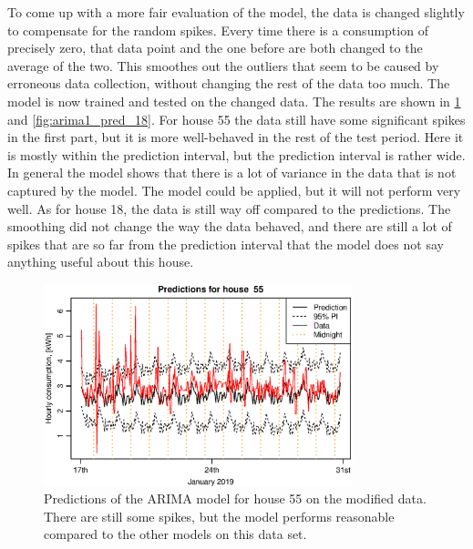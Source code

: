 \noindent To come up with a more fair evaluation of the model, the data is changed slightly to compensate for the random spikes. Every time there is a consumption of precisely zero, that data point and the one before are both changed to the average of the two. This smoothes out the outliers that seem to be caused by erroneous data collection, without changing the rest of the data too much. The model is now trained and tested on the changed data. The results are shown in \cref{fig:arima1_pred_55} and \cref{fig:arima1_pred_18}. For house 55 the data still have some significant spikes in the first part, but it is more well-behaved in the rest of the test period. Here it is mostly within the prediction interval, but the prediction interval is rather wide. In general the model shows that there is a lot of variance in the data that is not captured by the model. The model could be applied, but it will not perform very well. As for house 18, the data is still way off compared to the predictions. The smoothing did not change the way the data behaved, and there are still a lot of spikes that are so far from the prediction interval that the model does not say anything useful about this house.


\begin{figure}
    \centering
    \includegraphics[width=0.8\textwidth]{../../../figures/arimax/arima2_pred_55.eps}
    \caption{Predictions of the ARIMA model for house 55 on the modified data. There are still some spikes, but the model performs reasonable compared to the other models on this data set.}
    \label{fig:arima1_pred_55}
\end{figure}

